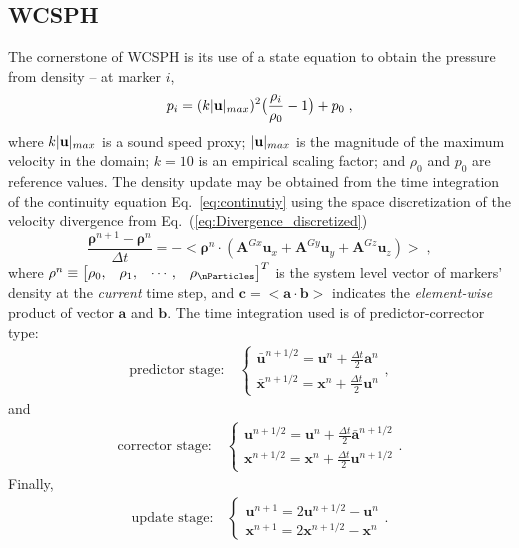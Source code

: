 \subsection{WCSPH}
The cornerstone of WCSPH is its use of a state equation to obtain the pressure from density -- at marker $i$,
\begin{equation}
\label{eq:State_eq}
p_i = (k| {\bf u}|_{max})^2\big(\frac{\rho_i}{\rho_0}-1\big)+p_0 \; ,
\end{equation}
where $k|{\bf u}|_{max}$ is a sound speed proxy; $|{\bf u}|_{max}$ is the magnitude of the maximum velocity in the domain; $k=10$ is an empirical scaling factor; and $\rho_0$ and $p_0$ are reference values. The density update may be obtained from the time integration of the continuity equation Eq.~\ref{eq:continutiy} using the space discretization of the velocity divergence from Eq.~(\ref{eq:Divergence_discretized}) 
\begin{equation}
\label{eq:rho2}
\frac{\mathbf{\rho}^{n+1}-\mathbf{\rho}^{n}}{\Delta t}=-<\mathbf{\rho}^n \cdot ({\mathbf{A}^{Gx} \mathbf{u}_x+\mathbf{A}^{Gy} \mathbf{u}_y+\mathbf{A}^{Gz}\mathbf{u}_z})> \;,
\end{equation}
where $\mathbf{\rho}^{n}\equiv\begin{bmatrix}
\rho_0,& \rho_1,& \cdots,& \rho_{\nParticles}\end{bmatrix}^T$ is the system level vector of markers' density at the \textit{current} time step, and $\mathbf{c}=<\mathbf{a} \cdot \mathbf{b}>$ indicates the \textit{element-wise} product of vector $\mathbf{a}$ and $\mathbf{b}$.
The time integration used is of predictor-corrector type:
\begin{align*}
\text{predictor stage:} \quad
\begin{cases}
{\bar{\mathbf{u}}}^{n+1/2}=\mathbf{u}^n+ \frac{\Delta t}{2} \mathbf{a}^n  \\ 
{\bar{\mathbf{x}}}^{n+1/2}=\mathbf{x}^n+ \frac{\Delta t}{2} \mathbf{u}^n
\end{cases} ,
\end{align*}
and
\begin{align*} 
\text{corrector stage:} \quad
\begin{cases}
{\mathbf{u}}^{n+1/2}=\mathbf{u}^n+ \frac{\Delta t}{2} {\bar{\mathbf{a}}}^{n+1/2} \\ 
{\mathbf{x}}^{n+1/2}=\mathbf{x}^n+ \frac{\Delta t}{2} \mathbf{u}^{n+1/2}
\end{cases} .
\end{align*}
Finally,
\begin{align*} 
\text{update stage:} \quad
\begin{cases}
{\mathbf{u}}^{n+1}=2\mathbf{u}^{n+1/2}-\mathbf{u}^n  \\ 
{\mathbf{x}}^{n+1}=2\mathbf{x}^{n+1/2}-\mathbf{x}^n
\end{cases} .
\end{align*}
